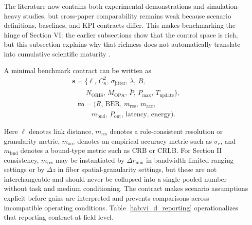 \documentclass[lettersize,journal]{IEEEtran}
\begin{document}
The literature now contains both experimental demonstrations and simulation-heavy studies, but cross-paper comparability remains weak because scenario definitions, baselines, and KPI contracts differ. This makes benchmarking the hinge of Section VI: the earlier subsections show that the control space is rich, but this subsection explains why that richness does not automatically translate into cumulative scientific maturity \cite{O_ISAC_023,O_ISAC_035,O_ISAC_054,O_ISAC_061,O_ISAC_091,O_ISAC_112,O_ISAC_127}.

A minimal benchmark contract can be written as
\begin{equation}
\begin{split}
\mathbf{s}=\{\ell,\,C_n^2,\,\sigma_{\text{jitter}},\,\lambda,\,B,\\
\qquad N_{\text{ORIS}},\,M_{\text{OPA}},\,\bar P,\,P_{\max},\,T_{\text{update}}\},
\end{split}
\end{equation}
\begin{equation}
\begin{split}
\mathbf{m}=(R,\,\mathrm{BER},\,m_{\text{res}},\,m_{\text{acc}},\\
\qquad m_{\text{bnd}},\,P_{\text{out}},\,\text{latency},\,\text{energy}).
\end{split}
\end{equation}

Here $\ell$ denotes link distance, $m_{\text{res}}$ denotes a role-consistent resolution or granularity metric, $m_{\text{acc}}$ denotes an empirical accuracy metric such as $\sigma_r$, and $m_{\text{bnd}}$ denotes a bound-type metric such as $\mathrm{CRB}$ or CRLB. For Section II consistency, $m_{\text{res}}$ may be instantiated by $\Delta r_{\min}$ in bandwidth-limited ranging settings or by $\Delta z$ in fiber spatial-granularity settings, but these are not interchangeable and should never be collapsed into a single pooled number without task and medium conditioning. The contract makes scenario assumptions explicit before gains are interpreted and prevents comparisons across incompatible operating conditions. Table~\ref{tab:vi_d_reporting} operationalizes that reporting contract at field level.
\end{document}

